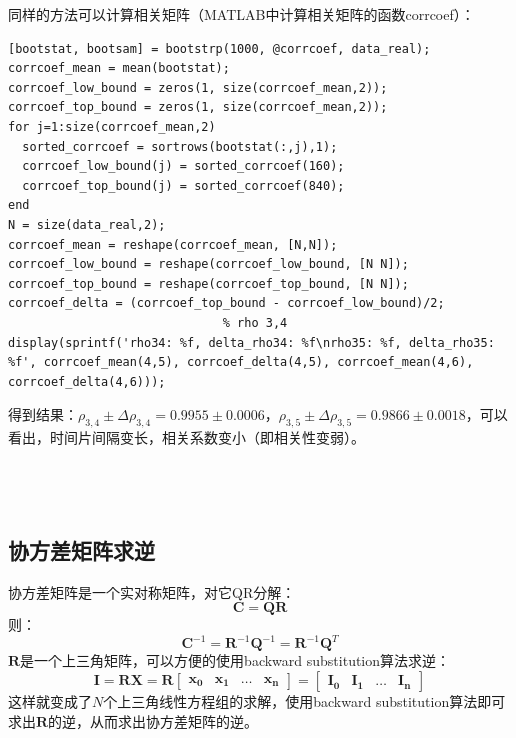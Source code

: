 \documentclass[paper=a4, fontsize=11pt]{scrartcl} %
\numberwithin{equation}{section} %
\numberwithin{figure}{section} %
\numberwithin{table}{section} %
\begin{document}
\begin{CJK*}{UTF8}{gbsn}
同样的方法可以计算相关矩阵（MATLAB中计算相关矩阵的函数corrcoef）：
\begin{lstlisting}
[bootstat, bootsam] = bootstrp(1000, @corrcoef, data_real);
corrcoef_mean = mean(bootstat);
corrcoef_low_bound = zeros(1, size(corrcoef_mean,2));
corrcoef_top_bound = zeros(1, size(corrcoef_mean,2));
for j=1:size(corrcoef_mean,2)
  sorted_corrcoef = sortrows(bootstat(:,j),1);
  corrcoef_low_bound(j) = sorted_corrcoef(160);
  corrcoef_top_bound(j) = sorted_corrcoef(840);
end
N = size(data_real,2);
corrcoef_mean = reshape(corrcoef_mean, [N,N]);
corrcoef_low_bound = reshape(corrcoef_low_bound, [N N]);
corrcoef_top_bound = reshape(corrcoef_top_bound, [N N]);
corrcoef_delta = (corrcoef_top_bound - corrcoef_low_bound)/2;
                              % rho 3,4
display(sprintf('rho34: %f, delta_rho34: %f\nrho35: %f, delta_rho35: %f', corrcoef_mean(4,5), corrcoef_delta(4,5), corrcoef_mean(4,6), corrcoef_delta(4,6)));
\end{lstlisting}
得到结果：$\rho_{3,4}\pm \Delta \rho_{3,4} = 0.9955 \pm 0.0006$，$\rho_{3,5}\pm \Delta \rho_{3,5} = 0.9866 \pm 0.0018$，可以看出，时间片间隔变长，相关系数变小（即相关性变弱）。
\\\\
\\\\
\subsection{协方差矩阵求逆}
协方差矩阵是一个实对称矩阵，对它QR分解：
\begin{equation}
\mathbf{C} = \mathbf{QR}
\end{equation}
则：
\begin{equation}
\mathbf{C}^{-1} = \mathbf{R}^{-1}\mathbf{Q}^{-1} = \mathbf{R}^{-1}\mathbf{Q}^{T}
\end{equation}
$\mathbf{R}$是一个上三角矩阵，可以方便的使用backward substitution算法求逆：
\begin{equation}
\mathbf{I}=\mathbf{RX}=\mathbf{R}\begin{bmatrix}\mathbf{x_0} & \mathbf{x_1} & \dots & \mathbf{x_n}\end{bmatrix}=\begin{bmatrix}\mathbf{I_0} & \mathbf{I_1} & \dots & \mathbf{I_n}\end{bmatrix}
\end{equation}
这样就变成了$N$个上三角线性方程组的求解，使用backward substitution算法即可求出$\mathbf{R}$的逆，从而求出协方差矩阵的逆。


\end{CJK*}
\end{document}

